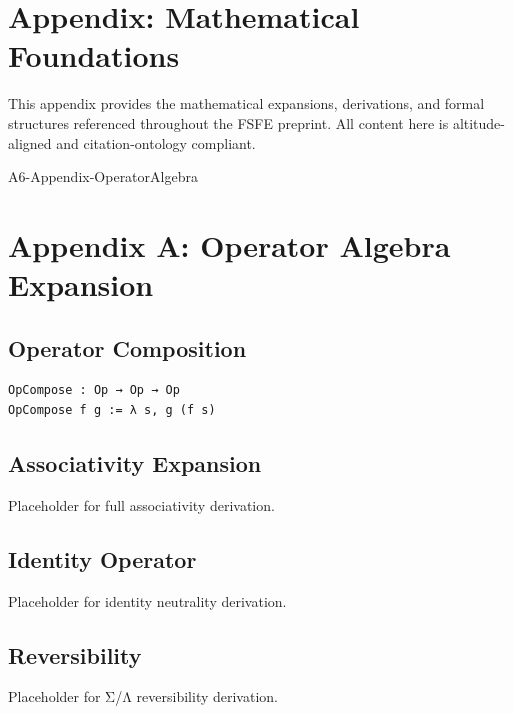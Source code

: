 \documentclass[11pt]{article}
\begin{document}


\section*{Appendix: Mathematical Foundations}

This appendix provides the mathematical expansions, derivations, and formal
structures referenced throughout the FSFE preprint. All content here is
altitude-aligned and citation-ontology compliant.

\newpage


\begin{citationmembrane}{A6-Appendix-OperatorAlgebra}
\end{citationmembrane}

\section{Appendix A: Operator Algebra Expansion}

\subsection{Operator Composition}
\begin{verbatim}
OpCompose : Op → Op → Op
OpCompose f g := λ s, g (f s)
\end{verbatim}

\subsection{Associativity Expansion}
Placeholder for full associativity derivation.

\subsection{Identity Operator}
Placeholder for identity neutrality derivation.

\subsection{Reversibility}
Placeholder for Σ/Λ reversibility derivation.
\end{document}
